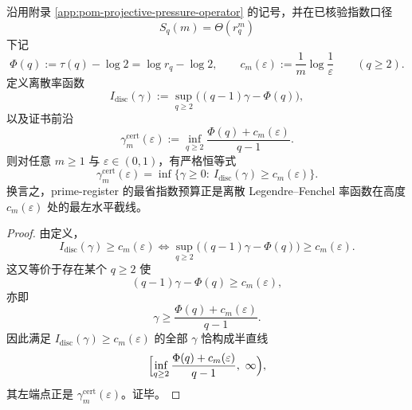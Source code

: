 \begin{theorem}[证书前沿恰为离散率函数的广义逆表述]\label{thm:conclusion-discrete-certificate-front-generalized-inverse}
沿用附录 \ref{app:pom-projective-pressure-operator} 的记号，并在已核验指数口径
\[
S_q(m)=\Theta(r_q^m)
\]
下记
\[
\Phi(q):=\tau(q)-\log 2=\log r_q-\log 2,
\qquad
c_m(\varepsilon):=\frac1m\log\frac1\varepsilon
\qquad
(q\ge 2).
\]
定义离散率函数
\[
I_{\mathrm{disc}}(\gamma):=\sup_{q\ge 2}\bigl((q-1)\gamma-\Phi(q)\bigr),
\]
以及证书前沿
\[
\gamma_m^{\mathrm{cert}}(\varepsilon):=
\inf_{q\ge 2}\frac{\Phi(q)+c_m(\varepsilon)}{q-1}.
\]
则对任意 \(m\ge 1\) 与 \(\varepsilon\in(0,1)\)，有严格恒等式
\[
\gamma_m^{\mathrm{cert}}(\varepsilon)
=
\inf\bigl\{\gamma\ge 0:\ I_{\mathrm{disc}}(\gamma)\ge c_m(\varepsilon)\bigr\}.
\]
换言之，prime-register 的最省指数预算正是离散 Legendre--Fenchel 率函数在高度 \(c_m(\varepsilon)\) 处的最左水平截线。
\end{theorem}
\begin{proof}
由定义，
\[
I_{\mathrm{disc}}(\gamma)\ge c_m(\varepsilon)
\iff
\sup_{q\ge 2}\bigl((q-1)\gamma-\Phi(q)\bigr)\ge c_m(\varepsilon).
\]
这又等价于存在某个 \(q\ge 2\) 使
\[
(q-1)\gamma-\Phi(q)\ge c_m(\varepsilon),
\]
亦即
\[
\gamma\ge \frac{\Phi(q)+c_m(\varepsilon)}{q-1}.
\]
因此满足 \(I_{\mathrm{disc}}(\gamma)\ge c_m(\varepsilon)\) 的全部 \(\gamma\) 恰构成半直线
\[
\Bigl[
\inf_{q\ge2}\frac{\Phi(q)+c_m(\varepsilon)}{q-1},
\ \infty
\Bigr),
\]
其左端点正是 \(\gamma_m^{\mathrm{cert}}(\varepsilon)\)。证毕。
\end{proof}

